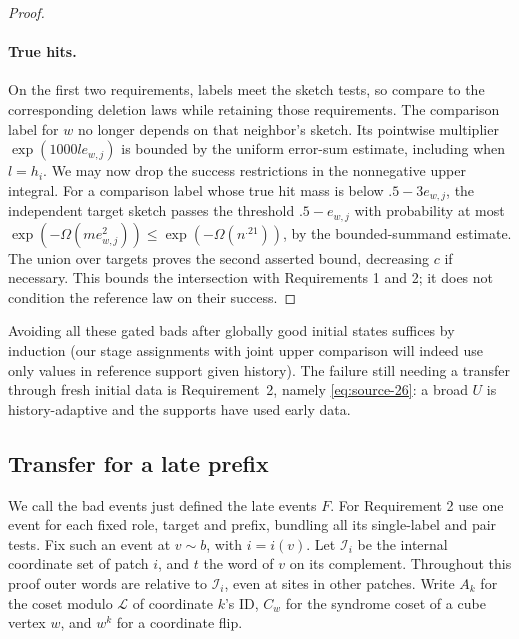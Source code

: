 \begin{proof}
\paragraph{True hits.}
On the first two requirements, labels meet the sketch tests, so compare to the corresponding deletion laws while retaining those requirements. The comparison label for \(w\) no longer depends on that neighbor's sketch. Its pointwise multiplier \(\exp(1000l e_{w,j})\) is bounded by the uniform error-sum estimate, including when \(l=h_i\). We may now drop the success restrictions in the nonnegative upper integral. For a comparison label whose true hit mass is below \(.5-3e_{w,j}\), the independent target sketch passes the threshold \(.5-e_{w,j}\) with probability at most \(\exp(-\Omega(m e_{w,j}^2))\le\exp(-\Omega(n^{.21}))\), by the bounded-summand estimate. The union over targets proves the second asserted bound, decreasing \(c\) if necessary. This bounds the intersection with Requirements 1 and 2; it does not condition the reference law on their success.
\end{proof}

Avoiding all these gated bads after globally good initial states suffices by induction (our stage assignments with joint upper comparison will indeed use only values in reference support given history). The failure still needing a transfer through fresh initial data is Requirement~2, namely \eqref{eq:source-26}: a broad \(U\) is history-adaptive and the supports have used early data.

\subsection{Transfer for a late prefix}
\label{sec:transfer-for-a-late-prefix}

We call the bad events just defined the late events \(F\). For
Requirement 2 use one event for each fixed role, target and prefix,
bundling all its single-label and pair tests. Fix such an event at
\(v\sim b\), with \(i=i(v)\). Let \(\mathcal I_i\) be the internal
coordinate set of patch \(i\), and \(t\) the word of \(v\) on its
complement. Throughout this proof outer words are relative to
\(\mathcal I_i\), even at sites in other patches. Write \(A_k\) for
the coset modulo \(\mathcal L\) of coordinate \(k\)'s ID, \(C_w\)
for the syndrome coset of a cube vertex \(w\), and \(w^k\) for a
coordinate flip.

